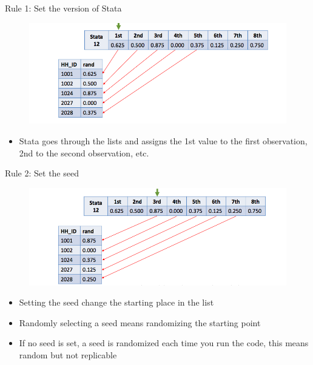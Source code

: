 \documentclass[aspectratio=169]{beamer}
\begin{document}
\begin{frame}{Rule 1: Set the version of Stata}
	\begin{figure}
		\centering
		\includegraphics[width=\linewidth]{img/rule1}
	\end{figure}
	\begin{itemize}
		\item Stata goes through the lists and assigns the 1st value to the first observation, 2nd to the second observation, etc.
	\end{itemize}
\end{frame}


\begin{frame}{Rule 2: Set the seed}
\begin{figure}
	\centering
	\includegraphics[width=\linewidth]{img/rule2}
\end{figure}
\begin{itemize}
	\item Setting the seed change the starting place in the list
	\item Randomly selecting a seed means randomizing the starting point
	\item If no seed is set, a seed is randomized each time you run the code, this means random but not replicable
\end{itemize}
\end{frame}
\end{document}
